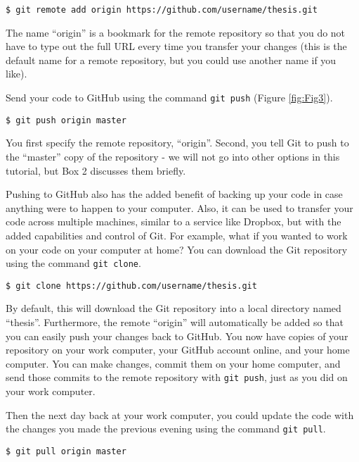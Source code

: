 \begin{verbatim}
$ git remote add origin https://github.com/username/thesis.git
\end{verbatim}

The name ``origin'' is a bookmark for the remote repository so that you do not have to type out the full URL every time you transfer your changes (this is the default name for a remote repository, but you could use another name if you like).

Send your code to GitHub using the command \verb|git push| (Figure \ref{fig:Fig3}).

\begin{verbatim}
$ git push origin master
\end{verbatim}

You first specify the remote repository, ``origin''.
Second, you tell Git to push to the ``master'' copy of the repository - we will not go into other options in this tutorial, but Box 2 discusses them briefly.

Pushing to GitHub also has the added benefit of backing up your code in case anything were to happen to your computer.
Also, it can be used to transfer your code across multiple machines, similar to a service like Dropbox, but with the added capabilities and control of Git.
For example, what if you wanted to work on your code on your computer at home?
You can download the Git repository using the command \verb|git clone|.

\begin{verbatim}
$ git clone https://github.com/username/thesis.git
\end{verbatim}

By default, this will download the Git repository into a local directory named ``thesis''.
Furthermore, the remote ``origin'' will automatically be added so that you can easily push your changes back to GitHub.
You now have copies of your repository on your work computer, your GitHub account online, and your home computer.
You can make changes, commit them on your home computer, and send those commits to the remote repository with \verb|git push|, just as you did on your work computer.

Then the next day back at your work computer, you could update the code with the changes you made the previous evening using the command \verb|git pull|.

\begin{verbatim}
$ git pull origin master
\end{verbatim}

